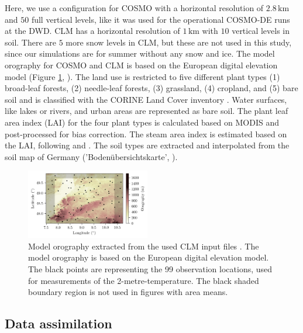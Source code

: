 \documentclass[hess, manuscript]{copernicus}
\begin{document}
Here, we use a configuration for COSMO with a horizontal resolution of $2.8\,\text{km}$ and $50$ full vertical levels, like it was used for the operational COSMO-DE runs at the DWD.
CLM has a horizontal resolution of $1\,\text{km}$ with $10$ vertical levels in soil.
There are $5$ more snow levels in CLM, but these are not used in this study, since our simulations are for summer without any snow and ice.
The model orography for COSMO and CLM is based on the European digital elevation model (Figure \ref{fig:model_orography}, \citealt{european_environment_agency_digital_2013}).
The land use is restricted to five different plant types (1) broad-leaf forests, (2) needle-leaf forests, (3) grassland, (4) cropland, and
(5) bare soil and is classified with the CORINE Land Cover inventory \citep{keil_corine_2011}.
Water surfaces, like lakes or rivers, and urban areas are represented as bare soil.
The plant leaf area index (LAI) for the four plant types is calculated based on MODIS \citep{myneni_global_2002} and post-processed for bias correction.
The steam area index is estimated based on the LAI, following \citet{lawrence_representing_2007} and \citet{zeng_coupling_2002}.
The soil types are extracted and interpolated from the soil map of Germany ('Boden\"ubersichtskarte', \citealt{bundesanstalt_fuer_geowissenschaften_und_rohstoffe_bodenuebersichtskarte_2016}).


\begin{figure}[ht]
	\includegraphics[width=0.48\textwidth]{figures/fig_02_orography.png}
	\caption{
		Model orography extracted from the used CLM input files \citep{european_environment_agency_digital_2013}.
		The model orography is based on the European digital elevation model.
		The black points are representing the 99 observation locations, used for measurements of the 2-metre-temperature.
		The black shaded boundary region is not used in figures with area means.
	}
	\label{fig:model_orography}
\end{figure}

\subsection{Data assimilation}
\end{document}
